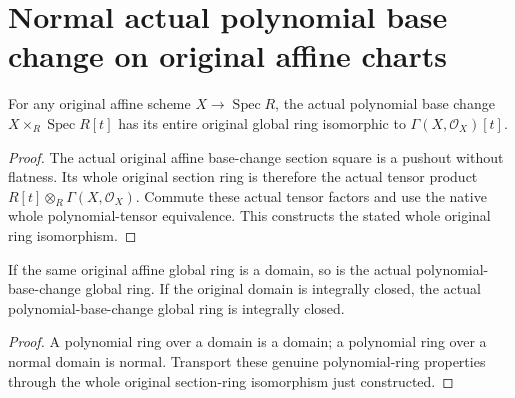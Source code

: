 \section{Normal actual polynomial base change on original affine charts}

\begin{definition}
\label{def:actual-affine-polynomial-base-change-sections}
\leanok
For any original affine scheme $X\to\operatorname{Spec}R$, the actual
polynomial base change $X\times_R\operatorname{Spec}R[t]$ has its entire
original global ring isomorphic to $\Gamma(X,\mathcal O_X)[t]$.
\end{definition}
\begin{proof}
The actual original affine base-change section square is a pushout without
flatness. Its whole original section ring is therefore the actual tensor
product $R[t]\otimes_R\Gamma(X,\mathcal O_X)$. Commute these actual tensor
factors and use the native whole polynomial-tensor equivalence. This constructs
the stated whole original ring isomorphism.
\end{proof}

\begin{theorem}
\label{thm:actual-affine-polynomial-base-change-ring-normal}
\leanok
{}
If the same original affine global ring is a domain, so is the actual
polynomial-base-change global ring. If the original domain is integrally
closed, the actual polynomial-base-change global ring is integrally closed.
\end{theorem}
\begin{proof}
A polynomial ring over a domain is a domain; a polynomial ring over a normal
domain is normal. Transport these genuine polynomial-ring properties through
the whole original section-ring isomorphism just constructed.
\end{proof}

